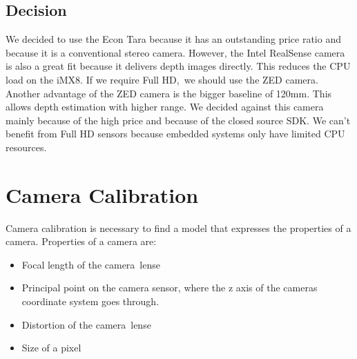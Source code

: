 \documentclass[11pt,a4paper,titlepage,oneside]{report}
\begin{document}
\section{Decision}

We decided to use the Econ Tara because it has an outstanding price ratio and because it is a conventional stereo camera. However, the Intel RealSense camera is also a great fit because it delivers depth images directly. This reduces the CPU load on the iMX8. If we require Full HD, we should use the ZED camera. Another advantage of the ZED camera is the bigger baseline of 120mm. This allows depth estimation with higher range. We decided against this camera mainly because of the high price and because of the closed source SDK. We can't benefit from Full HD sensors because embedded systems only have limited CPU resources.

\chapter{Camera Calibration}

Camera calibration is necessary to find a model that expresses the properties of a camera. Properties of a camera are:

\begin{itemize}
	\item Focal length of the camera lense
	\item Principal point on the camera sensor, where the z axis of the cameras coordinate system goes through.
	\item Distortion of the camera lense
	\item Size of a pixel
\end{itemize}
\end{document}
